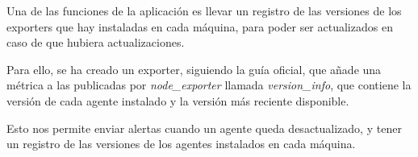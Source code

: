 Una de las funciones de la aplicación es llevar un registro de las versiones de los exporters que hay instaladas en cada máquina, para poder ser actualizados en caso de que hubiera actualizaciones.

Para ello, se ha creado un exporter, siguiendo la guía oficial\cite{exporter_creation}, que añade una métrica a las publicadas por \textit{node\_exporter} llamada \textit{version\_info}, que contiene la versión de cada agente instalado y la versión más reciente disponible.

Esto nos permite enviar alertas cuando un agente queda desactualizado, y tener un registro de las versiones de los agentes instalados en cada máquina.